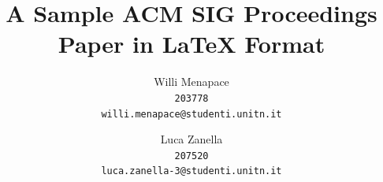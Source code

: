 \documentclass{acm_proc_article-sp-sigmod09}
\begin{document}
%

\title{A Sample {\ttlit ACM} SIG Proceedings Paper in LaTeX
Format}
%


\author{
	Willi Menapace\\
	\texttt{203778}\\
	\texttt{willi.menapace@studenti.unitn.it}
	\and
	Luca Zanella\\
	\texttt{207520}\\
	\texttt{luca.zanella-3@studenti.unitn.it}
}

%
%
\end{document}
